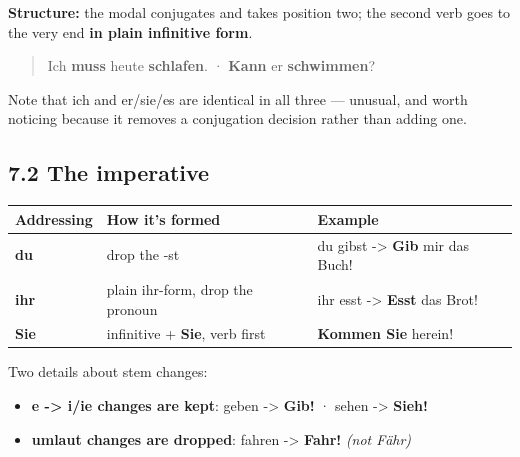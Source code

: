 \documentclass[
  11pt,
]{article}
\newcounter{none} %
\providecommand{\tightlist}{%
  \setlength{\itemsep}{0pt}\setlength{\parskip}{0pt}}
\begin{document}
\textbf{Structure:} the modal conjugates and takes position two; the
second verb goes to the very end \textbf{in plain infinitive form}.

\begin{quote}
Ich \textbf{muss} heute \textbf{schlafen}. · \textbf{Kann} er
\textbf{schwimmen}?
\end{quote}

Note that ich and er/sie/es are identical in all three --- unusual, and
worth noticing because it removes a conjugation decision rather than
adding one.

\subsection{7.2 The imperative}\label{the-imperative}

{\def\LTcaptype{none} %
\begin{longtable}[]{@{}
  >{\raggedright\arraybackslash}p{}
  >{\raggedright\arraybackslash}p{}
  >{\raggedright\arraybackslash}p{}@{}}
\toprule\noalign{}
\begin{minipage}[b]{\linewidth}\raggedright
Addressing
\end{minipage} & \begin{minipage}[b]{\linewidth}\raggedright
How it's formed
\end{minipage} & \begin{minipage}[b]{\linewidth}\raggedright
Example
\end{minipage} \\
\midrule\noalign{}
\endhead
\bottomrule\noalign{}
\endlastfoot
\textbf{du} & drop the -st & du gibst -\textgreater{} \textbf{Gib} mir
das Buch! \\
\textbf{ihr} & plain ihr-form, drop the pronoun & ihr esst
-\textgreater{} \textbf{Esst} das Brot! \\
\textbf{Sie} & infinitive + \textbf{Sie}, verb first & \textbf{Kommen
Sie} herein! \\
\end{longtable}
}

Two details about stem changes:

\begin{itemize}
\tightlist
\item
  \textbf{e -\textgreater{} i/ie changes are kept}: geben
  -\textgreater{} \textbf{Gib!} · sehen -\textgreater{} \textbf{Sieh!}
\item
  \textbf{umlaut changes are dropped}: fahren -\textgreater{}
  \textbf{Fahr!} \emph{(not Fähr)}
\end{itemize}
\end{document}
